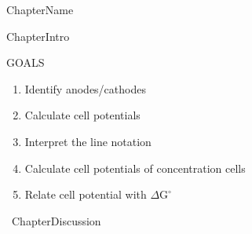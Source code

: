 \documentclass[main.tex]{subfiles}
\begin{document}
  
  {ChapterName}


      \begin{marginfigure}
\end{marginfigure}


  {ChapterIntro}
\begin{marginfigure}%
\begin{mytcbox}{GOALS}
\begin{enumerate}[label=\protect\circled{\color{white}\arabic*}]
\item Identify anodes/cathodes
\item Calculate cell potentials
\item Interpret the line notation
\item Calculate cell potentials of concentration cells
\item Relate cell potential with $\Delta \text{G}^{\circ}$
\end{enumerate}
\end{mytcbox}
\vspace{1cm}
\begin{tcolorbox}[enhanced,colback=red!5!white,colframe=black!50!red,boxrule=1pt,
  arc=0pt,outer arc=0pt,drop heavy lifted shadow]
\faGears\ 
  {ChapterDiscussion}


\end{tcolorbox}
\end{marginfigure}%
\end{document}
